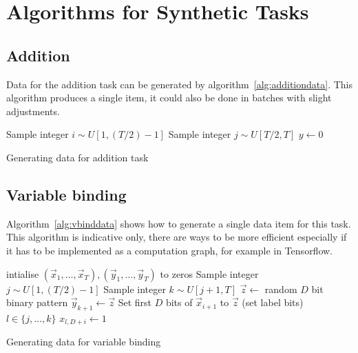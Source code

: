 \chapter{Algorithms for Synthetic Tasks}

\section{Addition}\label{sec:additionpseudo}
Data for the addition task can be generated by algorithm~\ref{alg:additiondata}. This algorithm
produces a single item, it could also be done in batches with slight adjustments.

\begin{algorithm}
	\BlankLine
	Sample integer \(i \sim U[1, (T/2)-1]\)\;
	Sample integer \(j \sim U[T/2, T]\)\;
	\(y \gets 0\)\;
	\caption{Generating data for addition task}
	\label{alg:additiondata}
\end{algorithm}

\section{Variable binding}\label{sec:vbindpseudo}
Algorithm~\ref{alg:vbinddata} shows how to generate a single data item for this task. This algorithm
is indicative only, there are ways to be more efficient especially if it has to be implemented as a
computation graph, for example in Tensorflow.

\begin{algorithm}
	\BlankLine
	intialise \((\vec{x}_1,\ldots,\vec{x}_T), (\vec{y}_1,\ldots,\vec{y}_T)\) to zeros\;
	 {
		Sample integer \(j \sim U[1, (T/2)-1]\) 
		Sample integer \(k \sim U[j+1, T]\) 
		\(\vec{z} \gets\) random \(D\) bit binary pattern\;
		\(\vec{y}_{k+1} \gets \vec{z}\)\;
		Set first \(D\) bits of \(\vec{x}_{i+1}\) to \(\vec{z}\)\;
		\For(set label bits){\(l \in \{j,\ldots,k\}\)}{
			\({x}_{l, D+i} \gets 1\)\;
		}
	}
	
	\caption{Generating data for variable binding}
	\label{alg:vbinddata}
\end{algorithm}